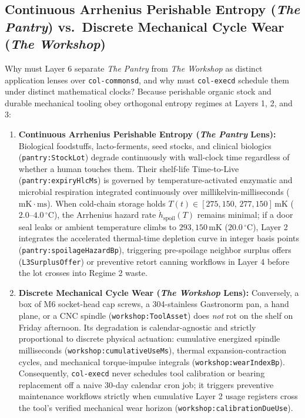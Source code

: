 \subsection{Continuous Arrhenius Perishable Entropy (\emph{The Pantry}) vs.\ Discrete Mechanical Cycle Wear (\emph{The Workshop})}
\label{subsec:arrhenius-pantry-vs-workshop-wear}

Why must Layer 6 separate \emph{The Pantry} from \emph{The Workshop} as distinct application lenses over \texttt{col-commonsd}, and why must \texttt{col-execd} schedule them under distinct mathematical clocks? Because perishable organic stock and durable mechanical tooling obey orthogonal entropy regimes at Layers 1, 2, and 3:

\begin{enumerate}
    \item \textbf{Continuous Arrhenius Perishable Entropy (\emph{The Pantry} Lens):}
    Biological foodstuffs, lacto-ferments, seed stocks, and clinical biologics (\texttt{pantry:StockLot}) degrade continuously with wall-clock time regardless of whether a human touches them. Their shelf-life Time-to-Live (\texttt{pantry:expiryHlcMs}) is governed by temperature-activated enzymatic and microbial respiration integrated continuously over millikelvin-milliseconds ($\mathrm{mK \cdot ms}$). When cold-chain storage holds $T(t) \in [275{,}150,\, 277{,}150]\,\mathrm{mK}$ ($2.0\text{--}4.0\,^\circ\mathrm{C}$), the Arrhenius hazard rate $\dot{h}_{\mathrm{spoil}}(T)$ remains minimal; if a door seal leaks or ambient temperature climbs to $293{,}150\,\mathrm{mK}$ ($20.0\,^\circ\mathrm{C}$), Layer 2 integrates the accelerated thermal-time depletion curve in integer basis points (\texttt{pantry:spoilageHazardBp}), triggering pre-spoilage neighbor surplus offers (\texttt{L3SurplusOffer}) or preventive retort canning workflows in Layer 4 before the lot crosses into Regime 2 waste.
    \item \textbf{Discrete Mechanical Cycle Wear (\emph{The Workshop} Lens):}
    Conversely, a box of $\mathrm{M6}$ socket-head cap screws, a 304-stainless Gastronorm pan, a hand plane, or a CNC spindle (\texttt{workshop:ToolAsset}) does \emph{not} rot on the shelf on Friday afternoon. Its degradation is calendar-agnostic and strictly proportional to discrete physical actuation: cumulative energized spindle milliseconds (\texttt{workshop:cumulativeUseMs}), thermal expansion-contraction cycles, and mechanical torque-impulse integrals (\texttt{workshop:wearIndexBp}). Consequently, \texttt{col-execd} never schedules tool calibration or bearing replacement off a naive 30-day calendar cron job; it triggers preventive maintenance workflows strictly when cumulative Layer 2 usage registers cross the tool's verified mechanical wear horizon (\texttt{workshop:calibrationDueUse}).
\end{enumerate}

